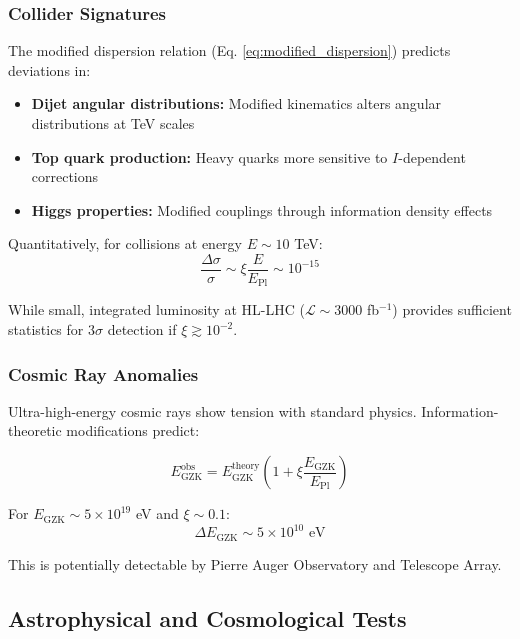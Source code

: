 \documentclass[12pt,a4paper]{article}
\theoremstyle{remark}
\begin{document}
\subsubsection{Collider Signatures}

The modified dispersion relation (Eq. \ref{eq:modified_dispersion}) predicts deviations in:

\begin{itemize}
\item \textbf{Dijet angular distributions:} Modified kinematics alters angular distributions at TeV scales
\item \textbf{Top quark production:} Heavy quarks more sensitive to $I$-dependent corrections
\item \textbf{Higgs properties:} Modified couplings through information density effects
\end{itemize}

Quantitatively, for collisions at energy $E \sim 10$ TeV:
\begin{equation}
\frac{\Delta\sigma}{\sigma} \sim \xi\frac{E}{E_{\text{Pl}}} \sim 10^{-15}
\end{equation}

While small, integrated luminosity at HL-LHC ($\mathcal{L} \sim 3000$ fb$^{-1}$) provides sufficient statistics for $3\sigma$ detection if $\xi \gtrsim 10^{-2}$.

\subsubsection{Cosmic Ray Anomalies}

Ultra-high-energy cosmic rays show tension with standard physics. Information-theoretic modifications predict:

\begin{equation}
E_{\text{GZK}}^{\text{obs}} = E_{\text{GZK}}^{\text{theory}}\left(1 + \xi\frac{E_{\text{GZK}}}{E_{\text{Pl}}}\right)
\end{equation}

For $E_{\text{GZK}} \sim 5 \times 10^{19}$ eV and $\xi \sim 0.1$:
\begin{equation}
\Delta E_{\text{GZK}} \sim 5 \times 10^{10} \text{ eV}
\end{equation}

This is potentially detectable by Pierre Auger Observatory and Telescope Array.

\subsection{Astrophysical and Cosmological Tests}
\end{document}
